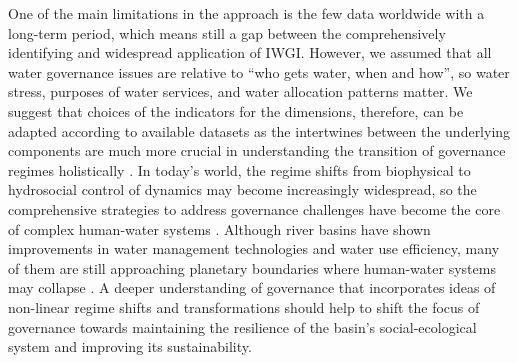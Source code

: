 One of the main limitations in the approach is the few data worldwide with a long-term period, which means still a gap between the comprehensively identifying and widespread application of IWGI.
However, we assumed that all water governance issues are relative to ``who gets water, when and how'', so water stress, purposes of water services, and water allocation patterns matter.
We suggest that choices of the indicators for the dimensions, therefore, can be adapted according to available datasets as the intertwines between the underlying components are much more crucial in understanding the transition of governance regimes holistically
\cite{steffenemergenceevolutionEarth2020,muneepeerakulemergenceresilienceselforganized2020,bodinCollaborativeenvironmentalgovernance2017,biermannNavigatingAnthropoceneImproving2012}.
In today's world, the regime shifts from biophysical to hydrosocial control of dynamics may become increasingly widespread, so the comprehensive strategies to address governance challenges have become the core of complex human-water systems
\cite{bestPaceHumanInducedChange2020,cummingLinkingeconomicgrowth2018,cummingImplicationsagriculturaltransitions2014}.
Although river basins have shown improvements in water management technologies and water use efficiency, many of them are still approaching planetary boundaries where human-water systems may collapse
\cite{anExploringeffectsGrain2017,degraafEnvironmentalflowlimits2019,hugginssocialecologicaldimensionschanging2020}.
A deeper understanding of governance that incorporates ideas of non-linear regime shifts and transformations should help to shift the focus of governance towards maintaining the resilience of the basin’s social-ecological system and improving its sustainability.
